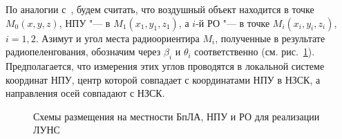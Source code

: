 \documentclass[a4paper,12pt]{article}
\begin{document}
По аналогии с~\cite{antennas}, будем считать, что воздушный объект находится в точке $M_0\left(x, y, z\right)$,
НПУ "--- в $M_1\left(x_1, y_1, z_1\right)$, а $i$-й РО "--- в точке $M_i\left(x_i, y_i, z_i \right)$, $i = 1,2$.
Азимут и угол места радиоориентира $M_i$, полученные в результате радиопеленгования, обозначим через
$\beta_i$ и $\theta_i$ соответственно (см. рис.~\ref{figure:pic1}). Предполагается, что измерения этих
углов проводятся в локальной системе координат НПУ, центр которой совпадает с координатами НПУ в НЗСК, а
направления осей совпадают с НЗСК.

\begin{figure}[htbp]
    \begin{center}


    \caption{Схемы размещения на местности БпЛА, НПУ и РО для реализации ЛУНС}
    \label{figure:pic1}
    \end{center}
\end{figure}

\end{document}
